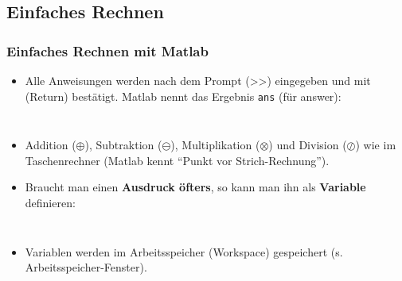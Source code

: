     \subsection{Einfaches Rechnen}
    \begin{frame}
      \frametitle{Einfaches Rechnen mit Matlab}
      \begin{itemize}
        \itemsep0.3cm
        \item Alle Anweisungen werden nach dem Prompt (>>) eingegeben und mit \keys{\return} (Return) bestätigt. Matlab nennt das Ergebnis \colorbox{bg}{\texttt{ans}} (für answer):

        \begin{columns}[t]
          \begin{column}{5cm}
            \colorbox{bg}{}
          \end{column}

          \begin{column}{5cm}
            \colorbox{bg}{}
          \end{column}
        \end{columns}

        \item Addition ($\oplus$), Subtraktion ($\ominus$), Multiplikation ($\otimes$) und Division ($\oslash$) wie im Taschenrechner (Matlab kennt ``Punkt vor Strich-Rechnung'').
        \item Braucht man einen \textbf{Ausdruck öfters}, so kann man ihn als \textbf{Variable} definieren:

        \vspace{0.3cm}

        \begin{columns}[t]
          \begin{column}{5cm}
            \colorbox{bg}{}
          \end{column}

          \begin{column}{5cm}
            \colorbox{bg}{}
          \end{column}
        \end{columns}

        \item Variablen werden im Arbeitsspeicher (Workspace) gespeichert (s. Arbeitsspeicher-Fenster).
      \end{itemize}
    \end{frame}

